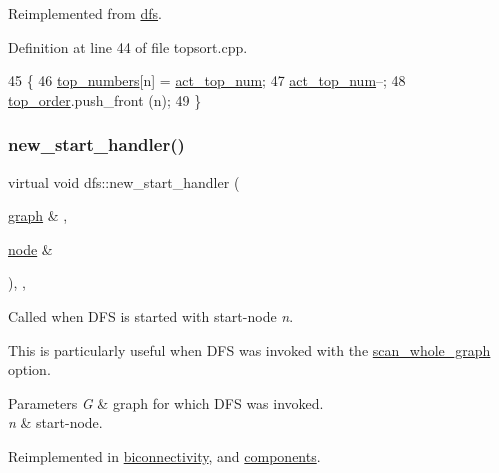 Reimplemented from \mbox{\hyperlink{classdfs_abfe33292cd567f22596ba0c313481582}{dfs}}.



Definition at line 44 of file topsort.\+cpp.


\begin{DoxyCode}
45 \{
46     \mbox{\hyperlink{classtopsort_ae57da1aae22ed92acd0d84c737a1da2b}{top\_numbers}}[n] = \mbox{\hyperlink{classtopsort_ae04dea9ee7f97be6e0e9673afb601f96}{act\_top\_num}};
47     \mbox{\hyperlink{classtopsort_ae04dea9ee7f97be6e0e9673afb601f96}{act\_top\_num}}--;
48     \mbox{\hyperlink{classtopsort_a8b18b1b7ce816683694d6ac567e55cb8}{top\_order}}.push\_front (n);
49 \}
\end{DoxyCode}
\mbox{\label{classdfs_a304b14458fb78f9feb3d8d5683d3cab5}} 
\subsubsection{\texorpdfstring{new\+\_\+start\+\_\+handler()}{new\_start\_handler()}}
{\footnotesize\ttfamily virtual void dfs\+::new\+\_\+start\+\_\+handler (\begin{DoxyParamCaption}\item[{\mbox{\hyperlink{classgraph}{graph}} \&}]{,  }\item[{\mbox{\hyperlink{classnode}{node}} \&}]{ }\end{DoxyParamCaption})\hspace{0.3cm}{\ttfamily [inline]}, {\ttfamily [virtual]}, {\ttfamily [inherited]}}



Called when D\+FS is started with start-\/node {\itshape n}. 

This is particularly useful when D\+FS was invoked with the \mbox{\hyperlink{classdfs_aa7c864a6f3a120720138b187b3ed95b5}{scan\+\_\+whole\+\_\+graph}} option.


\begin{DoxyParams}{Parameters}
{\em G} & graph for which D\+FS was invoked. \\
\hline
{\em n} & start-\/node. \\
\hline
\end{DoxyParams}


Reimplemented in \mbox{\hyperlink{classbiconnectivity_ae94213830755f1f4d477ec6bff0f25b8}{biconnectivity}}, and \mbox{\hyperlink{classcomponents_af53365bd737b34cf63e4a6b10879ffcc}{components}}.




